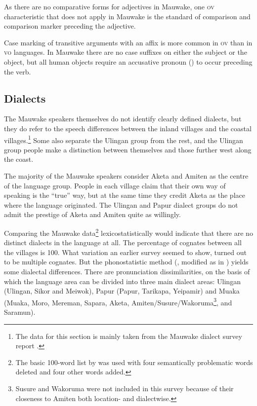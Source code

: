 As there are no comparative forms for adjectives in Mauwake, one \textsc{ov} characteristic that does not apply in Mauwake is the standard of comparison and comparison marker preceding the adjective. 

Case marking of transitive arguments with an affix is more common in \textsc{ov} than in \textsc{vo} languages.  In Mauwake there are no case suffixes on either the subject or the object, but all human objects require an accusative pronoun () to occur preceding the verb.

\subsection{Dialects}


The Mauwake speakers themselves do not identify clearly defined dialects, but they do refer to the speech differences between the inland villages and the coastal villages.\footnote{The data for this section is mainly taken from the Mauwake dialect survey report \citep{Jarvinen1988ms}.} Some also separate the Ulingan group from the rest, and the Ulingan group people make a distinction between themselves and those further west along the coast.

The majority of the Mauwake speakers consider Aketa and Amiten as the centre of the language group. People in each village claim that their own way of speaking is the ``true'' way, but at the same time they credit Aketa as the place where the language originated.  The Ulingan and Papur dialect groups do not admit the prestige of Aketa and Amiten quite as willingly.

Comparing the Mauwake data\footnote{The basic 100-word list by \citet[55--59]{Ezard1978} was used with four semantically problematic words deleted and four other words added.} lexicostatistically would indicate that there are no distinct dialects in the language at all. The percentage of cognates between all the villages is 100.  What variation an earlier survey seemed to show, turned out to be multiple cognates. But the phonostatistic method (\citealt{GrimesEtAl1959}, modified as in \citealt[177--178]{Simons1977}) yields some dialectal differences. There are pronunciation dissimilarities, on the basis of which the language area can be divided into three main dialect areas: Ulingan (Ulingan, Sikor and Meiwok), Papur (Papur, Tarikapa, Yeipamir) and Muaka (Muaka, Moro, Mereman, Sapara, Aketa, Amiten/Susure/Wakoruma\footnote{Susure and Wakoruma were not included in this survey because of their closeness to Amiten both location- and dialectwise.}, and Saramun). 

